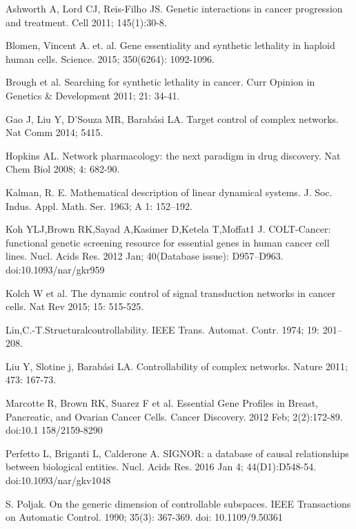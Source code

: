 \documentclass[oribibl]{llncs}
\begin{document}
%
\begin{thebibliography}{xx}

Ashworth A, Lord CJ, Reis-Filho JS. Genetic interactions in cancer progression and treatment. Cell 2011; 145(1):30-8.


Blomen, Vincent A. et. al. Gene essentiality and synthetic lethality in haploid human cells. Science. 2015; 350(6264): 1092-1096.


Brough et al. Searching for synthetic lethality in cancer. Curr Opinion in Genetics \& Development 2011; 21: 34-41.

Gao J, Liu Y, D'Souza MR, Barabási LA. Target control of complex networks. Nat Comm 2014; 5415.


Hopkins AL. Network pharmacology: the next paradigm in drug discovery. Nat Chem Biol 2008; 4: 682-90.

Kalman, R. E. Mathematical description of linear dynamical systems. J. Soc. Indus. Appl. Math. Ser. 1963; A 1: 152–192.


Koh YLJ,Brown RK,Sayad A,Kasimer D,Ketela T,Moffat1 J. COLT-Cancer: functional genetic screening resource for essential genes in human cancer cell lines. Nucl. Acids Res. 2012 Jan; 40(Database issue): D957–D963. doi:10.1093/nar/gkr959

Kolch W et al. The dynamic control of signal transduction networks in cancer cells. Nat Rev 2015; 15: 515-525.

 Lin,C.-T.Structuralcontrollability. IEEE Trans. Automat. Contr. 1974; 19: 201–208.


Liu Y, Slotine j, Barabási LA. Controllability of complex networks. Nature 2011; 473: 167-73.


Marcotte R, Brown RK, Suarez F et al. Essential Gene Profiles in Breast,
Pancreatic, and Ovarian Cancer Cells. Cancer Discovery. 2012 Feb; 2(2):172-89.
doi:10.1
158/2159-8290

Perfetto L, Briganti L, Calderone A. SIGNOR: a database of causal relationships between biological entities. Nucl. Acids Res. 2016 Jan 4; 44(D1):D548-54. doi:10.1093/nar/gkv1048

S. Poljak. On the generic dimension of controllable subspaces. IEEE Transactions on Automatic Control. 1990; 35(3): 367-369. doi: 10.1109/9.50361



\end{thebibliography}
\end{document}
